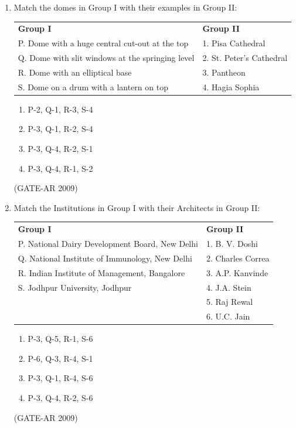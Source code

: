 \documentclass[a4paper,10pt]{article}
\begin{document}
\begin{enumerate}
    \item Match the domes in Group I with their examples in Group II:  \\
    \begin{tabular}{ l l }
	\textbf{Group I} & \textbf{Group II} \\
	P. Dome with a huge central cut-out at the top & 1. Pisa Cathedral \\
	Q. Dome with slit windows at the springing level & 2. St. Peter’s Cathedral \\
	R. Dome with an elliptical base & 3. Pantheon \\
	S. Dome on a drum with a lantern on top & 4. Hagia Sophia \\
	\end{tabular}
	\begin{multicols}{2}
	\begin{enumerate}
        \item P-2, Q-1, R-3, S-4
        \item P-3, Q-1, R-2, S-4
        \item P-3, Q-4, R-2, S-1
        \item P-3, Q-4, R-1, S-2
    \end{enumerate}
	\end{multicols}
    \hfill (GATE-AR 2009)

    \item Match the Institutions in Group I with their Architects in Group II:  \\
    \begin{tabular}{ l l }
	\textbf{Group I} & \textbf{Group II} \\
	P. National Dairy Development Board, New Delhi & 1. B. V. Doshi \\
	Q. National Institute of Immunology, New Delhi & 2. Charles Correa \\
	R. Indian Institute of Management, Bangalore & 3. A.P. Kanvinde \\
	S. Jodhpur University, Jodhpur & 4. J.A. Stein \\
	& 5. Raj Rewal \\
	& 6. U.C. Jain \\
	\end{tabular}
	\begin{multicols}{2}
	\begin{enumerate}
        \item P-3, Q-5, R-1, S-6
        \item P-6, Q-3, R-4, S-1
        \item P-3, Q-1, R-4, S-6
        \item P-3, Q-4, R-2, S-6
    \end{enumerate}
	\end{multicols}
    \hfill (GATE-AR 2009)


\end{enumerate}
\end{document}
